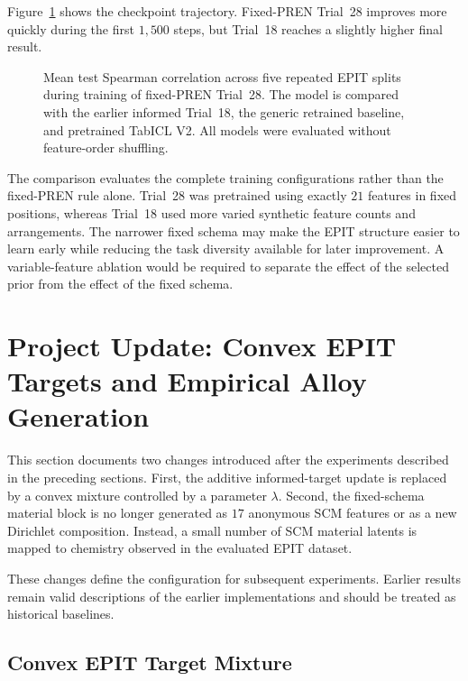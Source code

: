 \documentclass{article}
\begin{document}
Figure~\ref{fig:fixed-pren-trial28-spearman} shows the checkpoint trajectory.
Fixed-PREN Trial~28 improves more quickly during the first \(1{,}500\) steps,
but Trial~18 reaches a slightly higher final result.

\begin{figure}[htbp]
    \centering
    
    \caption{Mean test Spearman correlation across five repeated EPIT splits
    during training of fixed-PREN Trial~28. The model is compared with the
    earlier informed Trial~18, the generic retrained baseline, and pretrained
    TabICL V2. All models were evaluated without feature-order shuffling.}
    \label{fig:fixed-pren-trial28-spearman}
\end{figure}

The comparison evaluates the complete training configurations rather than the
fixed-PREN rule alone. Trial~28 was pretrained using exactly \(21\) features in
fixed positions, whereas Trial~18 used more varied synthetic feature counts and
arrangements. The narrower fixed schema may make the EPIT structure easier to
learn early while reducing the task diversity available for later improvement.
A variable-feature ablation would be required to separate the effect of the
selected prior from the effect of the fixed schema.

\section{Project Update: Convex EPIT Targets and Empirical Alloy Generation}
\label{sec:project-update-empirical-composition}

This section documents two changes introduced after the experiments described in
the preceding sections. First, the additive informed-target update is replaced by
a convex mixture controlled by a parameter \(\lambda\). Second, the fixed-schema
material block is no longer generated as \(17\) anonymous SCM features or as a
new Dirichlet composition. Instead, a small number of SCM material latents is
mapped to chemistry observed in the evaluated EPIT dataset.

These changes define the configuration for subsequent experiments. Earlier
results remain valid descriptions of the earlier implementations and should be
treated as historical baselines.

\subsection{Convex EPIT Target Mixture}
\end{document}
